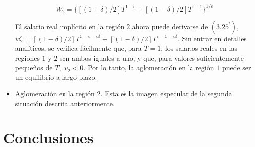 \begin{itemize}
	$$W_2 = \lbrace\left[(1+\delta)/2\right]T^{1-\epsilon}+\left[(1-\delta)/2\right]T^{\epsilon-1}\rbrace^{1/\epsilon}$$

	El salario real implícito en la región $2$ ahora puede derivarse de $(3.25^{'})$, $w_2^\epsilon = [(1 -\delta)/2]T^{1-\epsilon-\epsilon \delta}+ [(1-\delta)/2]T^{\epsilon-1-\epsilon \delta}$. Sin entrar en detalles analíticos, se verifica fácilmente que, para $T = 1$, los salarios reales en las regiones $1$ y $2$ son ambos iguales a uno, y que, para valores suficientemente pequeños de $T$, $w_2 < 0$. Por lo tanto, la aglomeración en la región $1$ puede ser un equilibrio a largo plazo.\\
    \item Aglomeración en la región $2$. Esta es la imagen especular de la segunda situación descrita anteriormente.
\end{itemize}


\section{Conclusiones}

